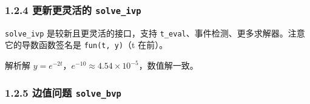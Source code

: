 \begin{Shaded}
\begin{Highlighting}[]
\end{Highlighting}
\end{Shaded}

\subsubsection{\texorpdfstring{1.2.4 更新更灵活的
\texttt{solve\_ivp}}{1.2.4 更新更灵活的 solve\_ivp}}\label{ux66f4ux65b0ux66f4ux7075ux6d3bux7684-solve_ivp}

\texttt{solve\_ivp} 是较新且更灵活的接口，支持
\texttt{t\_eval}、事件检测、更多求解器。注意它的导数函数签名是
\texttt{fun(t,\ y)}（t 在前）。

\begin{Shaded}
\begin{Highlighting}[]

     \OperatorTok{{-}} \OperatorTok{*}

\OperatorTok{=}\NormalTok{, }\NormalTok{), [}\NormalTok{], t\_eval}\OperatorTok{=}\NormalTok{, }\NormalTok{, }\NormalTok{))}
\NormalTok{(}\NormalTok{, sol.y[}\NormalTok{, }\OperatorTok{{-}}\NormalTok{])}
\NormalTok{(}\NormalTok{, }
\end{Highlighting}
\end{Shaded}

\begin{Shaded}
\begin{Highlighting}[]
\end{Highlighting}
\end{Shaded}

解析解 \(y=e^{-2t}\)，\(e^{-10}\approx4.54\times10^{-5}\)，数值解一致。

\subsubsection{\texorpdfstring{1.2.5 边值问题
\texttt{solve\_bvp}}{1.2.5 边值问题 solve\_bvp}}\label{ux8fb9ux503cux95eeux9898-solve_bvp}


